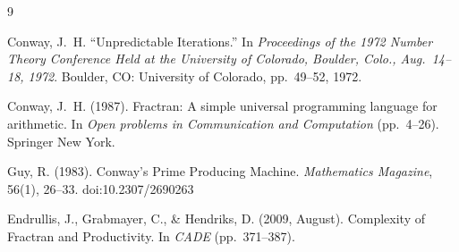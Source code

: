 \documentclass[12pt]{article}
\begin{document}
\begin{thebibliography}{9}

Conway, J.\ H. ``Unpredictable Iterations.'' In \textit{Proceedings of the 1972 Number Theory Conference Held at the University of Colorado, Boulder, Colo., Aug.\ 14--18, 1972}. Boulder, CO: University of Colorado, pp.\ 49--52, 1972.

Conway, J.\ H. (1987). Fractran: A simple universal programming language for arithmetic. In \textit{Open problems in Communication and Computation} (pp.\ 4--26). Springer New York.

Guy, R. (1983). Conway's Prime Producing Machine. \textit{Mathematics Magazine}, 56(1), 26--33. doi:10.2307/2690263

Endrullis, J., Grabmayer, C., \& Hendriks, D. (2009, August). Complexity of Fractran and Productivity. In \textit{CADE} (pp.\ 371--387).

\end{thebibliography}
\end{document}
